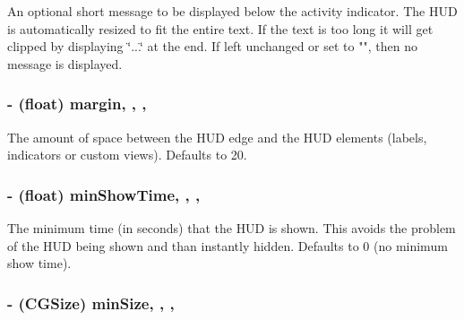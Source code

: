 An optional short message to be displayed below the activity indicator. The H\+U\+D is automatically resized to fit the entire text. If the text is too long it will get clipped by displaying \char`\"{}...\char`\"{} at the end. If left unchanged or set to "", then no message is displayed. \hypertarget{interface_m_b_progress_h_u_d_a4126e72234f8afcb87905a9ed65c022c}{
\subsubsection[{margin}]{\setlength{\rightskip}{0pt plus 5cm}-\/ (float) margin\hspace{0.3cm}{\ttfamily [read]}, {\ttfamily [write]}, {\ttfamily [atomic]}, {\ttfamily [assign]}}}\label{interface_m_b_progress_h_u_d_a4126e72234f8afcb87905a9ed65c022c}
The amount of space between the H\+U\+D edge and the H\+U\+D elements (labels, indicators or custom views). Defaults to 20. \hypertarget{interface_m_b_progress_h_u_d_a9946e4b0b16d75f070ff0cbcc50226ef}{
\subsubsection[{min\+Show\+Time}]{\setlength{\rightskip}{0pt plus 5cm}-\/ (float) min\+Show\+Time\hspace{0.3cm}{\ttfamily [read]}, {\ttfamily [write]}, {\ttfamily [atomic]}, {\ttfamily [assign]}}}\label{interface_m_b_progress_h_u_d_a9946e4b0b16d75f070ff0cbcc50226ef}
The minimum time (in seconds) that the H\+U\+D is shown. This avoids the problem of the H\+U\+D being shown and than instantly hidden. Defaults to 0 (no minimum show time). \hypertarget{interface_m_b_progress_h_u_d_a69c6b2cad533d6fe7d90df02bf7f8b0c}{
\subsubsection[{min\+Size}]{\setlength{\rightskip}{0pt plus 5cm}-\/ (C\+G\+Size) min\+Size\hspace{0.3cm}{\ttfamily [read]}, {\ttfamily [write]}, {\ttfamily [atomic]}, {\ttfamily [assign]}}}\label{interface_m_b_progress_h_u_d_a69c6b2cad533d6fe7d90df02bf7f8b0c}
